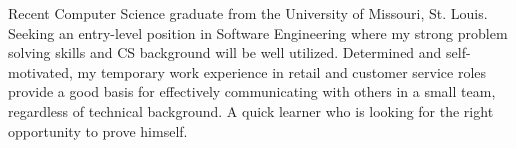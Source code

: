 \begin{cvletter}

Recent Computer Science graduate from the University of Missouri, St. Louis. Seeking an entry-level position in Software Engineering where my strong problem solving skills and CS background will be well utilized. Determined and self-motivated, my temporary work experience in retail and customer service roles provide a good basis for effectively communicating with others in a small team, regardless of technical background. A quick learner who is looking for the right opportunity to prove himself.
\end{cvletter}


